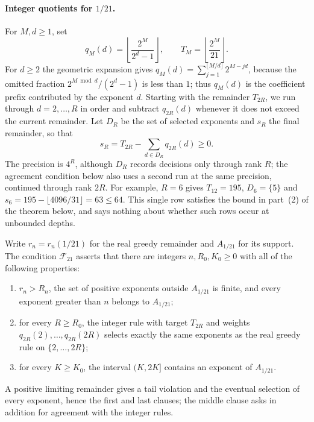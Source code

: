 \documentclass[11pt]{article}
\begin{document}
\paragraph{Integer quotients for $1/21$.}
For $M,d\ge1$, set
\[
 q_M(d)=\left\lfloor\frac{2^M}{2^d-1}\right\rfloor,
 \qquad T_M=\left\lfloor\frac{2^M}{21}\right\rfloor.
\]
For $d\ge2$ the geometric expansion gives
$q_M(d)=\sum_{j=1}^{\lfloor M/d\rfloor}2^{M-jd}$, because the omitted
fraction $2^{M\bmod d}/(2^d-1)$ is less than $1$; thus $q_M(d)$ is the
coefficient prefix contributed by the exponent $d$. Starting with the
remainder $T_{2R}$, we run through $d=2,\ldots,R$ in order and subtract
$q_{2R}(d)$ whenever it does not exceed the current remainder. Let
$D_R$ be the set of selected exponents and $s_R$ the final remainder,
so that
\[
 s_R=T_{2R}-\sum_{d\in D_R}q_{2R}(d)\ge0.
\]
The precision is $4^R$, although $D_R$ records decisions only through
rank $R$; the agreement condition below also uses a second run at the
same precision, continued through rank $2R$. For example, $R=6$ gives
$T_{12}=195$, $D_6=\{5\}$ and $s_6=195-\lfloor4096/31\rfloor=63\le64$.
This single row satisfies the bound in part~(2) of the theorem below,
and says nothing about whether such rows occur at unbounded depths.


Write $r_n=r_n(1/21)$ for the real greedy remainder and $A_{1/21}$ for
its support. The condition $\mathcal F_{21}$ asserts that there are
integers $n,R_0,K_0\ge0$ with all of the following properties:
\begin{enumerate}
\item $r_n>R_n$, the set of positive exponents outside $A_{1/21}$ is
finite, and every exponent greater than $n$ belongs to $A_{1/21}$;
\item for every $R\ge R_0$, the integer rule with target $T_{2R}$ and
weights $q_{2R}(2),\ldots,q_{2R}(2R)$ selects exactly the same exponents
as the real greedy rule on $\{2,\ldots,2R\}$;
\item for every $K\ge K_0$, the interval $(K,2K]$ contains an exponent
of $A_{1/21}$.
\end{enumerate}
A positive limiting remainder gives a tail violation and the eventual
selection of every exponent, hence the first and last clauses; the
middle clause asks in addition for agreement with the integer rules.
\end{document}

